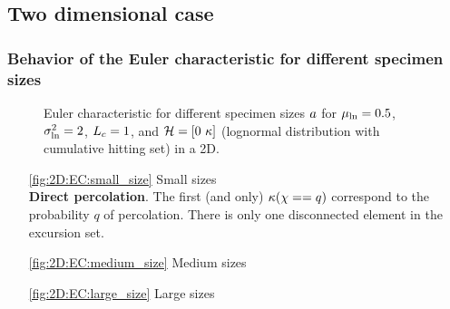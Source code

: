 \documentclass[a4paper,12pt]{article}
\begin{document}
\subsection{Two dimensional case}
\subsubsection{Behavior of the Euler characteristic for different specimen sizes}
\begin{figure}[!h]
  \centering
  \subfigure[$\Msize=0.001$\label{fig:2D:EC:small_size}]{\scalebox{0.35}{}}\hfill
  \subfigure[$\Msize=2.5$\label{fig:2D:EC:medium_size}]  {\scalebox{0.35}{}}\hfill
  \subfigure[$\Msize=8$\label{fig:2D:EC:large_size}]    {\scalebox{0.35}{}}
  \caption{Euler characteristic for different specimen sizes $a$ for $\mu_{\ln}=0.5$, $\sigma_{\ln}^2=2$, $L_c=1$, and $\mathcal{H}=[0\ \kappa]$ (lognormal distribution with cumulative hitting set) in a 2D.\label{fig:2D:EC}}
\end{figure}

\begin{itemize}
  \item [\ref{fig:2D:EC:small_size}] Small sizes \\ \textbf{Direct percolation}. The first (and only) $\kappa(\chi==q)$ correspond to the probability $q$ of percolation. There is only one disconnected element in the excursion set.
  \item [\ref{fig:2D:EC:medium_size}] Medium sizes \\ 
  \item [\ref{fig:2D:EC:large_size}] Large sizes \\ 
\end{itemize}
\end{document}
